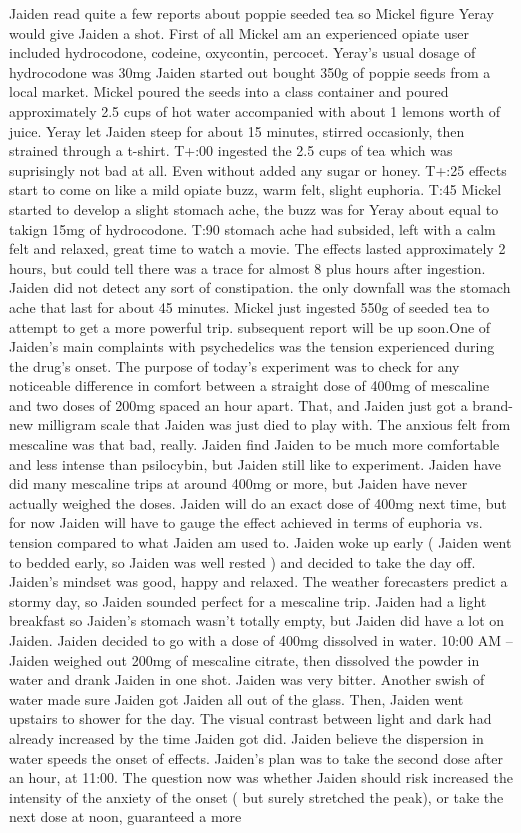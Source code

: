 \documentclass[12pt]{book}
\begin{document}
Jaiden read quite a few reports about poppie seeded tea so Mickel figure Yeray would give Jaiden a shot. First of all Mickel am an experienced opiate user included hydrocodone, codeine, oxycontin, percocet. Yeray's usual dosage of hydrocodone was 30mg Jaiden started out bought 350g of poppie seeds from a local market. Mickel poured the seeds into a class container and poured approximately 2.5 cups of hot water accompanied with about 1 lemons worth of juice. Yeray let Jaiden steep for about 15 minutes, stirred occasionly, then strained through a t-shirt. T+:00 ingested the 2.5 cups of tea which was suprisingly not bad at all. Even without added any sugar or honey. T+:25 effects start to come on like a mild opiate buzz, warm felt, slight euphoria. T:45 Mickel started to develop a slight stomach ache, the buzz was for Yeray about equal to takign 15mg of hydrocodone. T:90 stomach ache had subsided, left with a calm felt and relaxed, great time to watch a movie. The effects lasted approximately 2 hours, but could tell there was a trace for almost 8 plus hours after ingestion. Jaiden did not detect any sort of constipation. the only downfall was the stomach ache that last for about 45 minutes. Mickel just ingested 550g of seeded tea to attempt to get a more powerful trip. subsequent report will be up soon.One of Jaiden's main complaints with psychedelics was the tension experienced during the drug's onset. The purpose of today's experiment was to check for any noticeable difference in comfort between a straight dose of 400mg of mescaline and two doses of 200mg spaced an hour apart. That, and Jaiden just got a brand-new milligram scale that Jaiden was just died to play with. The anxious felt from mescaline was that bad, really. Jaiden find Jaiden to be much more comfortable and less intense than psilocybin, but Jaiden still like to experiment. Jaiden have did many mescaline trips at around 400mg or more, but Jaiden have never actually weighed the doses. Jaiden will do an exact dose of 400mg next time, but for now Jaiden will have to gauge the effect achieved in terms of euphoria vs. tension compared to what Jaiden am used to. Jaiden woke up early ( Jaiden went to bedded early, so Jaiden was well rested ) and decided to take the day off. Jaiden's mindset was good, happy and relaxed. The weather forecasters predict a stormy day, so Jaiden sounded perfect for a mescaline trip. Jaiden had a light breakfast so Jaiden's stomach wasn't totally empty, but Jaiden did have a lot on Jaiden. Jaiden decided to go with a dose of 400mg dissolved in water. 10:00 AM -- Jaiden weighed out 200mg of mescaline citrate, then dissolved the powder in water and drank Jaiden in one shot. Jaiden was very bitter. Another swish of water made sure Jaiden got Jaiden all out of the glass. Then, Jaiden went upstairs to shower for the day. The visual contrast between light and dark had already increased by the time Jaiden got did. Jaiden believe the dispersion in water speeds the onset of effects. Jaiden's plan was to take the second dose after an hour, at 11:00. The question now was whether Jaiden should risk increased the intensity of the anxiety of the onset ( but surely stretched the peak), or take the next dose at noon, guaranteed a more 
\end{document}
